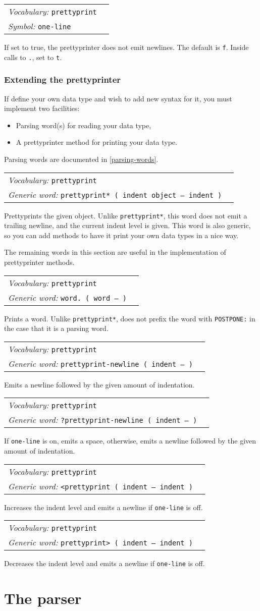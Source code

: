 \documentclass{book}
\newcommand{\vocabulary}[1]{\emph{Vocabulary:} \texttt{#1}&\\}
\newcommand{\symbolword}[1]{\index{\texttt{#1}}\emph{Symbol:} \texttt{#1}&\\}
\newcommand{\genericword}[2]{\index{\texttt{#1}}\emph{Generic word:} \texttt{#2}&\\}
\newcommand{\wordtable}[1]{

\begin{tabularx}{12cm}[t]{lX}
\hline
#1
\hline
\end{tabularx}

}
\begin{document}
\wordtable{
\vocabulary{prettyprint}
\symbolword{one-line}
}
If set to true, the prettyprinter does not emit newlines. The default is \texttt{f}. Inside calls to \texttt{.}, set to \texttt{t}.

\subsubsection{Extending the prettyprinter}

If define your own data type and wish to add new syntax for it, you must implement two facilities:
\begin{itemize}
\item Parsing word(s) for reading your data type,
\item A prettyprinter method for printing your data type.
\end{itemize}
Parsing words are documented in \ref{parsing-words}.

\wordtable{
\vocabulary{prettyprint}
\genericword{prettyprint*}{prettyprint* ( indent object -- indent )}
}
Prettyprints the given object. Unlike \texttt{prettyprint*}, this word does not emit a trailing newline, and the current indent level is given. This word is also generic, so you can add methods to have it print your own data types in a nice way.

The remaining words in this section are useful in the implementation of prettyprinter methods.
\wordtable{
\vocabulary{prettyprint}
\genericword{word.}{word.~( word -- )}
}
Prints a word. Unlike \texttt{prettyprint*}, does not prefix the word with \texttt{POSTPONE:} in the case that it is a parsing word.
\wordtable{
\vocabulary{prettyprint}
\genericword{prettyprint-newline}{prettyprint-newline ( indent -- )}
}
Emits a newline followed by the given amount of indentation.
\wordtable{
\vocabulary{prettyprint}
\genericword{?prettyprint-newline}{?prettyprint-newline ( indent -- )}
}
If \texttt{one-line} is on, emits a space, otherwise, emits a newline followed by the given amount of indentation.
\wordtable{
\vocabulary{prettyprint}
\genericword{<prettyprint}{<prettyprint~( indent -- indent )}
}
Increases the indent level and emits a newline if \texttt{one-line} is off.
\wordtable{
\vocabulary{prettyprint}
\genericword{prettyprint>}{prettyprint>~( indent -- indent )}
}
Decreases the indent level and emits a newline if \texttt{one-line} is off.

\section{The parser}
\end{document}
